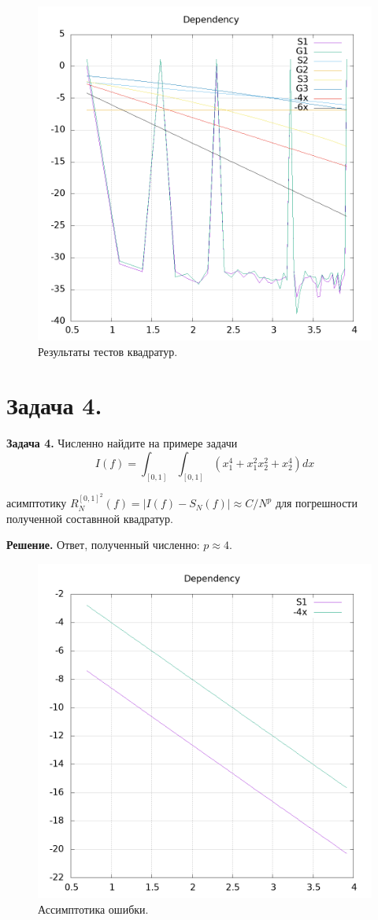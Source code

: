 \documentclass[14pt,a4paper]{extarticle}
\newcommand{\1}{\mathbbm{1}}
\begin{document}
    \begin{figure}
        \centering
        \includegraphics[scale=0.7]{dep.png}
        \caption{Результаты тестов квадратур.}
    \end{figure}



    \section{\textbf{Задача 4.}}
\textbf{Задача 4.}  Численно найдите на примере задачи
\begin{equation*}
    I(f) = \int_{[0,1]}\int_{[0,1]} (x_1^4 + x_1^2 x_2^2 + x_2^4)dx
\end{equation*}

асимптотику $R^{[0,1]^2}_N(f) = |I(f) - S_N(f)| \approx C/N^p$ для погрешности полученной составнной
квадратур.

\textbf{Решение.} Ответ, полученный численно: $p \approx 4$.
\begin{figure}
    \centering
    \includegraphics[scale=0.7]{dep4.png}
    \caption{Ассимптотика ошибки.}
\end{figure}
\end{document}

